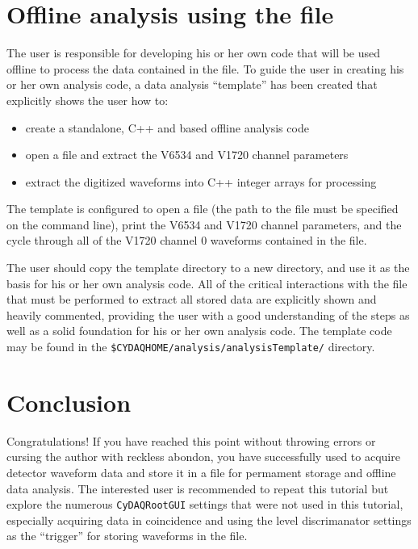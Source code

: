 \section{Offline analysis using the \ROOT file}
The \ADAQ user is responsible for developing his or her own code that
will be used offline to process the data contained in the \ROOT
file. To guide the user in creating his or her own analysis code, a
data analysis ``template'' has been created that explicitly shows the
user how to:
\begin{itemize}
  \item{create a standalone, C++ and \ROOT based offline analysis code}
  \item{open a \ADAQ \ROOT file and extract the V6534 and V1720 channel parameters}
  \item{extract the digitized waveforms into C++ integer arrays for processing}
\end{itemize}
The template is configured to open a \ROOT file (the path to the file
must be specified on the command line), print the V6534 and V1720
channel parameters, and the cycle through all of the V1720 channel 0
waveforms contained in the \ROOT file.

The user should copy the template directory to a new directory, and
use it as the basis for his or her own analysis code. All of the
critical interactions with the \ROOT file that must be performed to
extract all stored data are explicitly shown and heavily commented,
providing the user with a good understanding of the steps as well as a
solid foundation for his or her own analysis code. The template code
may be found in the \texttt{\$CYDAQHOME/analysis/analysisTemplate/}
directory.

\section{Conclusion}
Congratulations! If you have reached this point without throwing
errors or cursing the author with reckless abondon, you have
successfully used \ADAQ to acquire detector waveform data and store it
in a \ROOT file for permament storage and offline data analysis. The
interested user is recommended to repeat this tutorial but explore the
numerous \texttt{CyDAQRootGUI} settings that were not used in this
tutorial, especially acquiring data in coincidence and using the level
discrimanator settings as the ``trigger'' for storing waveforms in the
\ROOT file.

